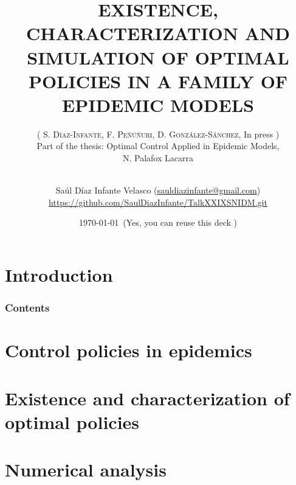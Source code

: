 \documentclass[xcolor={x11names,svgnames,dvipsnames},trans]{beamer}
\author[Sa\'ul D\'iaz Infante Velasco]{
    \texorpdfstring{
        Sa\'ul D\'iaz Infante Velasco
        (\url{sauldiazinfante@gmail.com})
        \\
        \url{https://github.com/SaulDiazInfante/TalkXXIXSNIDM.git}}
        {Sa\'ul D\'iaz Infante Velasco}
    }
\title{
    EXISTENCE, CHARACTERIZATION AND SIMULATION OF OPTIMAL
    POLICIES IN A FAMILY OF EPIDEMIC MODELS}
\subtitle{
    \texorpdfstring{
        (%
            \textsc{
                S. D\'iaz-Infante,
                F. Pe\~n\'u\~nuri,
                D. Gonz\'alez-S\'anchez}, In press%
        )\\%
    Part of the thesis:
    Optimal Control Applied in Epidemic Models,
    \\
    N. Palafox Lacarra
    \\
    \hrulefill\
    \adforn{57}
    \thickspace\wb{m}
    \thickspace\adforn{29}\
    \hrulefill
    }{}
}
\date[\ccbyncsa]{\today \ (Yes, you can reuse this deck \Smiley)}
\begin{document}
    \begin{frame}[plain]
        \maketitle
    \end{frame}
    \section{Introduction}
        
        \begin{frame}
            \frametitle{Contents}
            \tableofcontents
        \end{frame}
    \section{Control policies in epidemics}
        
    \section{Existence and characterization of optimal policies}
    \section{Numerical analysis}
\end{document}
